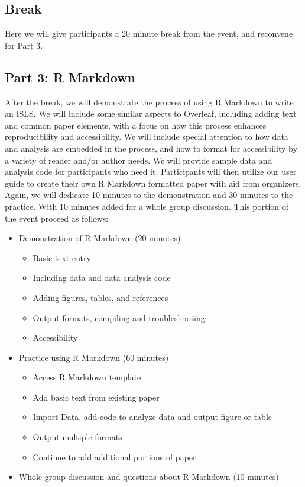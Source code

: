 \documentclass{article}
\begin{document}


\subsection{Break}
Here we will give participants a 20 minute break from the event, and reconvene for Part 3.

\subsection{Part 3: R Markdown} 
After the break, we will demonstrate the process of using R Markdown to write an ISLS. We will include some similar aspects to Overleaf, including adding text and common paper elements, with a focus on how this process enhances reproducibility and accessibility. We will include special attention to how data and analysis are embedded in the process, and how to format for accessibility by a variety of reader and/or author needs. We will provide sample data and analysis code for participants who need it. Participants will then utilize our user guide to create their own R Markdown formatted paper with aid from organizers. Again, we will dedicate 10 minutes to the demonstration and 30 minutes to the practice. With 10 minutes added for a whole group discussion. This portion of the event proceed as follows: 
\begin{itemize}
    \item Demonstration of R Markdown (20 minutes)
    \begin{itemize}
        \item Basic text entry
        \item Including data and data analysis code
        \item Adding figures, tables, and references
        \item Output formats, compiling and troubleshooting
        \item Accessibility
    \end{itemize}
    \item Practice using R Markdown (60 minutes)
    \begin{itemize}
        \item Access R Markdown template 
        \item Add basic text from existing paper
        \item Import Data, add code to analyze data and output figure or table
        \item Output multiple formats
        \item Continue to add additional portions of paper
    \end{itemize}
    \item Whole group discussion and questions about R Markdown (10 minutes)
\end{itemize}
\end{document}
